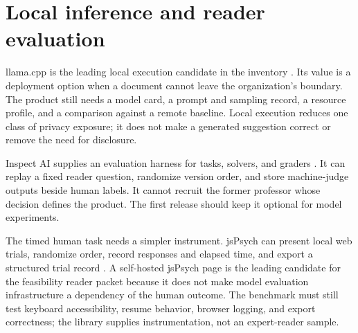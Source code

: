 \section{Local inference and reader evaluation}
\label{sec:software-inference}

llama.cpp is the leading local execution candidate in the inventory
\citep{llamacpp2026}. Its value is a deployment option when a document cannot
leave the organization's boundary. The product still needs a model card, a
prompt and sampling record, a resource profile, and a comparison against a
remote baseline. Local execution reduces one class of privacy exposure; it
does not make a generated suggestion correct or remove the need for disclosure.

Inspect AI supplies an evaluation harness for tasks, solvers, and graders
\citep{inspectai2026}. It can replay a fixed reader question, randomize version
order, and store machine-judge outputs beside human labels. It cannot recruit
the former professor whose decision defines the product. The first release
should keep it optional for model experiments.

The timed human task needs a simpler instrument. jsPsych can present local web
trials, randomize order, record responses and elapsed time, and export a
structured trial record \citep{jspsych2026}. A self-hosted jsPsych page is the
leading candidate for the feasibility reader packet because it does not make
model evaluation infrastructure a dependency of the human outcome. The
benchmark must still test keyboard accessibility, resume behavior, browser
logging, and export correctness; the library supplies instrumentation, not an
expert-reader sample.

